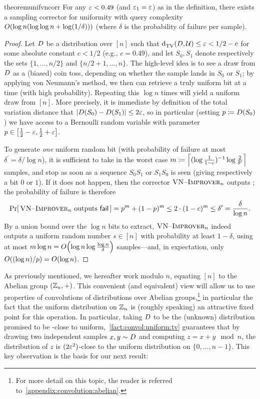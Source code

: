 \begin{restatable}{theorem}{unifvncorr}\label{lemma:sampling:corrector:uniformity:vneumann}
  For any $\varepsilon< 0.49$ (and $\varepsilon_1=\varepsilon$) as in the definition, there exists a sampling corrector for uniformity with query complexity $\bigO{\log n(\log\log n + \log(1/\delta))}$ (where $\delta$ is the probability of failure per sample).
\end{restatable}
\begin{proof}
Let $D$ be a distribution over $[n]$ such that ${\operatorname{d}_{\textrm{TV}}^{}\!\left({D, \mathcal{U}}\right)}\leq \varepsilon < 1/2 - c$ for some absolute constant {$c < 1/2$ (e.g., $c=0.49$)}, and let $S_0, S_1$ denote respectively the sets $\{1,\dots,n/2\}$ and $\{n/2+1,\dots,n\}$. The high-level idea is to see a draw from $D$ as a (biased) coin toss, depending on whether the sample lands in $S_0$ or $S_1$; by applying von Neumann's method, we then can retrieve a truly uniform bit at a time (with high probability). Repeating this $\log n$ times will yield a uniform draw from $[n]$. More precisely, it is immediate by definition of the total variation distance that $\left\lvert  D(S_0)-D(S_1)  \right\rvert \leq 2\varepsilon$, so in particular (setting $p\coloneqq D(S_0)$) we have access to a Bernoulli random variable with parameter $p\in\left[\frac{1}{2}-\varepsilon,\frac{1}{2}+\varepsilon\right]$.

To generate \emph{one} uniform random bit (with probability of failure at most $\delta^\prime=\delta/\log n$), it is sufficient to take in the worst case $m\coloneqq \left\lceil (\log\frac{1}{1-c})^{-1}\log\frac{2}{\delta^\prime} \right\rceil$ samples, and stop as soon as a sequence $S_0S_1$ or $S_1S_0$ is seen (giving respectively a bit $0$ or $1$). If it does not happen, then the corrector $\textsc{VN--Improver}_n$ outputs \fail; the probability of failure is therefore
\[
   \Pr\!\left[\, \textsc{VN--Improver}_n\text{ outputs }\textsf{fail}\, \right] = p^{m} + (1-p)^m \leq 2\cdot (1-c)^m \leq \delta^\prime = \frac{\delta}{\log n}.
\]
By a union bound over the $\log n$ bits to extract, $\textsc{VN--Improver}_n$ indeed outputs a uniform random number $s\in[n]$ with probability at least $1-\delta$, using at most $m\log n = \bigO{\log n \log\frac{\log n}{\delta}}$ samples---and, in expectation, only $\bigO{(\log n)/{p}} = \bigO{\log n}$.
\end{proof}
As previously mentioned, we hereafter work modulo $n$, equating $[n]$ to the Abelian group $(\mathbb{Z}_n,+)$. This convenient (and equivalent) view will allow us to use properties of convolutions of distributions over Abelian groups,\footnote{For more detail on this topic, the reader is referred to~\autoref{appendix:convolution:abelian}.} in particular the fact that the uniform distribution on $\mathbb{Z}_n$ is (roughly speaking) an attractive fixed point for this operation. In particular, taking $D$ to be the (unknown) distribution promised to be \eps-close to uniform,~\autoref{fact:convol:uniform:tv} guarantees that by drawing two independent samples $x,y\sim D$ and computing $z=x+y \mod n$, the distribution of $z$ is $(2\varepsilon^2)$-close to the uniform distribution on $\{0,\dots,n-1\}$. This key observation is the basis for our next result:
